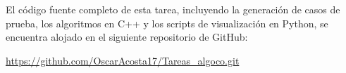El código fuente completo de esta tarea, incluyendo la generación de casos de prueba, los algoritmos en C++ y los scripts de visualización en Python, se encuentra alojado en el siguiente repositorio de GitHub:

\url{https://github.com/OscarAcosta17/Tareas_algoco.git}